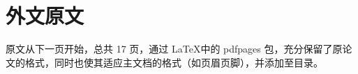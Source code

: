 \chapter{外文原文}


原文从下一页开始，总共 17 页，通过 \LaTeX 中的 pdfpages 包，充分保留了原论文的格式，同时也使其适应主文档的格式（如页眉页脚），并添加至目录。

